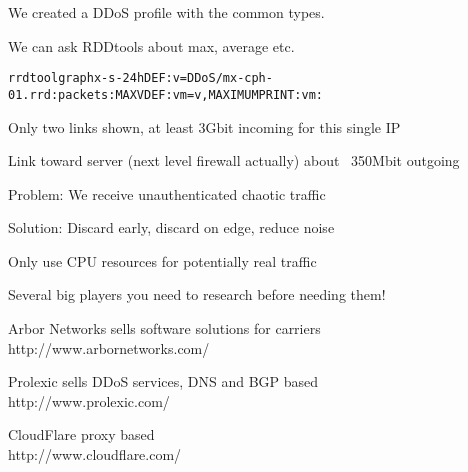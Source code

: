 \documentclass[20pt,landscape,a4paper,footrule]{foils}
\begin{document}


We created a DDoS profile with the common types.

We can ask RDDtools about max, average etc.
\begin{alltt}\small
rrdtool graph x -s -24h DEF:v=DDoS/mx-cph-01.rrd:packets:MAX VDEF:vm=v,MAXIMUM PRINT:vm:%.lf
\end{alltt}





\centerline{Only two links shown, at least 3Gbit incoming for this single IP}

\centerline{Link toward server (next level firewall actually) about ~350Mbit outgoing}

\begin{list1}
\item Problem: We receive unauthenticated chaotic traffic

\item Solution: Discard early, discard on edge, reduce noise

\item Only use CPU resources for potentially real traffic
\end{list1}





\begin{list1}
\item Several big players you need to research before needing them!
\item Arbor Networks sells software solutions for carriers\\
http://www.arbornetworks.com/

\item Prolexic sells DDoS services, DNS and BGP based\\
http://www.prolexic.com/

\item CloudFlare proxy based\\
http://www.cloudflare.com/
\end{list1}
\end{document}
